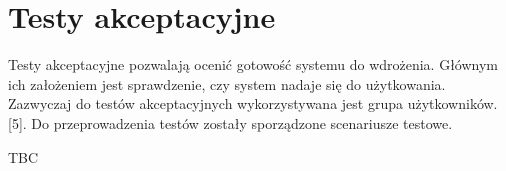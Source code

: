 \section{Testy akceptacyjne}

Testy akceptacyjne pozwalają ocenić gotowość systemu do wdrożenia. Głównym ich założeniem jest sprawdzenie, czy system nadaje się do użytkowania. Zazwyczaj do testów akceptacyjnych wykorzystywana jest grupa użytkowników. [5]. Do przeprowadzenia testów zostały sporządzone scenariusze testowe.


TBC